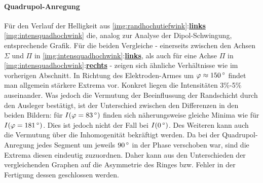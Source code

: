 \documentclass[numbers=noenddot,a4paper,notitlepage,twoside,BCOR15mm]{scrbook}
\newcommand{\degree}{^\circ}
\newcommand{\fett}[1]{\textbf{#1}}
\begin{document}
				\paragraph{Quadrupol-Anregung}

					Für den Verlauf der Helligkeit aus \ref{img:randhochutiefwink}:\underline{\fett{links}} \ref{img:intensquadhochwink} die, analog zur Analyse der Dipol-Schwingung, entsprechende Grafik. Für die beiden Vergleiche - einerseits zwischen den Achsen $\Sigma$ und $\Pi$ in \ref{img:intensquadhochwink}:\underline{\fett{links}}, als auch für eine Achse $\Pi$ in \ref{img:intensquadhochwink}:\underline{\fett{rechts}} - zeigen sich ähnliche Verhältnisse wie im vorherigen Abschnitt. In Richtung des Elektroden-Armes um $\varphi\approx\unit[150]{\degree}$ findet man allgemein stärkere Extrema vor. Konkret liegen die Intensitäten 3\%-5\% auseinander. Was jedoch die Vermutung der Beeinflussung der Randschicht durch den Ausleger bestätigt, ist der Unterschied zwischen den Differenzen in den beiden Bildern: für $I(\varphi=\unit[83]{\degree})$ finden sich näherungsweise gleiche Minima wie für $I(\varphi=\unit[181]{\degree})$. Dies ist jedoch nicht der Fall bei $I(\unit[0]{\degree})$. Des Weiteren kann auch die Vermutung über die Inhomogenität bekräftigt werden. Da bei der Quadrupol-Anregung jedes Segment um jeweils $\unit[90]{\degree}$ in der Phase verschoben war, sind die Extrema diesen eindeutig zuzuordnen. Daher kann aus den Unterschieden der vergleichenden Graphen auf die Asymmetrie des Ringes bzw. Fehler in der Fertigung dessen geschlossen werden.
\end{document}
